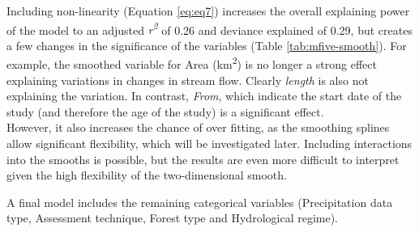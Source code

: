 \documentclass[]{elsarticle} %
\begin{document}
Including non-linearity (Equation \eqref{eq:eq7}) increases the overall explaining power of the model to an adjusted \emph{r\textsuperscript{2}} of 0.26 and deviance explained of 0.29, but creates a few changes in the significance of the variables (Table \ref{tab:mfive-smooth}). For example, the smoothed variable for Area (km\textsuperscript{2}) is no longer a strong effect explaining variations in changes in stream flow. Clearly \emph{length} is also not explaining the variation. In contrast, \emph{From}, which indicate the start date of the study (and therefore the age of the study) is a significant effect.\\
However, it also increases the chance of over fitting, as the smoothing splines allow significant flexibility, which will be investigated later. Including interactions into the smooths is possible, but the results are even more difficult to interpret given the high flexibility of the two-dimensional smooth.

A final model includes the remaining categorical variables (Precipitation data type, Assessment technique, Forest type and Hydrological regime).
\end{document}
